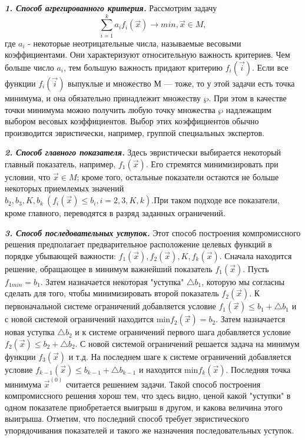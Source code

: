 {\textbf{\textit{1. Способ агрегированного критерия.}} Рассмотрим задачу
\begin{equation*}
\sum_{i=1}^{k}a_{i}f_{i}(\vec{x}) \rightarrow min, \vec{x} \in M,
\end{equation*}
где $a_{i}$ - некоторые неотрицательные числа, называемые весовыми коэффициентами. Они характеризуют  относительную важность критериев. Чем больше число $a_{i}$, тем большую важность придают критерию $f_{i}(\vec{i})$. Если все функции $f_{i}(\vec{i})$ выпуклые и множество М — тоже, то у этой задачи есть точка минимума, и она обязательно принадлежит множеству $\wp $. При этом в качестве точки минимума можно получить любую точку множества  $\wp $ надлежащим  выбором весовых коэффициентов. Выбор этих коэффициентов обычно производится эвристически, например, группой специальных экспертов.

\textbf{\textit{2. Способ главного показателя.}} Здесь эвристически выбирается некоторый главный показатель, например, $f_{1}(\vec{x})$. Его стремятся минимизировать при условии, что $\vec{x} \in M$; кроме того, остальные показатели остаются не больше некоторых приемлемых значений \\ $b_{2}, b_{3}, K, b_{k} \: (f_{i}(\vec{x}) \leq b_{i}, i = 2, 3, K, k )$.При таком подходе все показатели, кроме главного, переводятся в разряд заданных ограничений.

\textbf{\textit{3. Способ последовательных уступок.}}
Этот способ построения компромиссного решения предполагает предварительное расположение целевых функций в порядке убывающей  важности: $f_{1}(\vec{x}), f_{2}(\vec{x}), K, f_{k}(\vec{x})$. Сначала находится решение, обращающее в минимум важнейший показатель $f_{1}(\vec{x})$. Пусть $f_{1min}=b_{1}$. Затем назначается некоторая "уступка" $\bigtriangleup b_{1}$, которую мы согласны сделать для того, чтобы минимизировать второй показатель $f_{2}(\vec{x})$. К первоначальной системе ограничений добавляется условие $f_{1}(\vec{x}) \leq b_{1}+\bigtriangleup b_{1}$ и с новой системой ограничений находится min$f_{2}(\vec{x})=b_{2}$. Затем назначается новая уступка  $\bigtriangleup b_{2}$ и к системе ограничений первого шага добавляется условие $f_{2}(\vec{x}) \leq b_{2}+\bigtriangleup b_{2}$. С новой системой ограничений решается задача на минимум функции $f_{3}(\vec{x})$ и т.д. На последнем шаге к системе ограничений добавляется условие $f_{k-1}(\vec{x}) \leq b_{k-1}+\bigtriangleup b_{k-1}$ и находится min$f_{k}(\vec{x})$. Последняя точка минимума $\vec{x}^{(0)}$ считается решением задачи. Такой способ построения компромиссного решения хорош тем, что здесь видно,  ценой какой "уступки" в одном показателе приобретается выигрыш в другом, и какова величина этого выигрыша. Отметим, что последний способ требует эвристического упорядочивания показателей и  такого же  назначения последовательных уступок.

}
